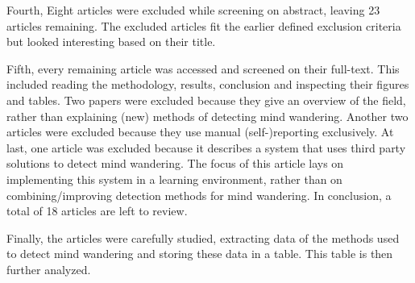 Fourth, Eight articles were excluded while screening on abstract, leaving 23 articles remaining. 
The excluded articles fit the earlier defined exclusion criteria but looked interesting based on their title.

Fifth, every remaining article was accessed and screened on their full-text. This included reading the methodology, results, conclusion and inspecting their figures and tables.
Two papers were excluded because they give an overview of the field, rather than explaining (new) methods of detecting mind wandering. 
Another two articles were excluded because they use manual (self-)reporting exclusively.
At last, one article was excluded because it describes a system that uses third party solutions to detect mind wandering. The focus of this article lays on implementing this system in a learning environment, rather than on combining/improving detection methods for mind wandering.
In conclusion, a total of 18 articles are left to review.

Finally, the articles were carefully studied, extracting data of the methods used to detect mind wandering and storing these data in a table. This table is then further analyzed.

